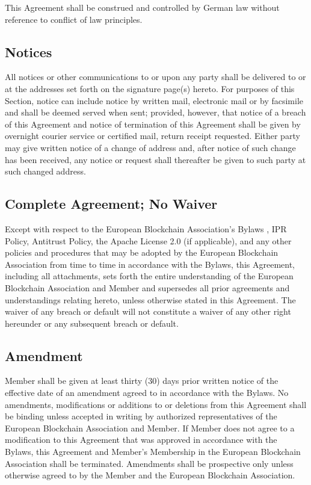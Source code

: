 \documentclass{article}
\begin{document}
This Agreement shall be construed and controlled by German law without reference to conflict of law principles.

\subsection{Notices}

All notices or other communications to or upon any party shall be delivered to or at the addresses set forth on the signature page(s) hereto. For purposes of this Section, notice can include notice by written mail, electronic mail or by facsimile and shall be deemed served when sent; provided, however, that notice of a breach of this Agreement and notice of termination of this Agreement shall be given by overnight courier service or certified mail, return receipt requested. Either party may give written notice of a change of address and, after notice of such change has been received, any notice or request shall thereafter be given to such party at such changed address.

\subsection{Complete Agreement; No Waiver}

Except with respect to the European Blockchain Association’s Bylaws , IPR Policy, Antitrust Policy, the Apache License 2.0 (if applicable), and any other policies and procedures that may be adopted by the European Blockchain Association from time to time in accordance with the Bylaws, this Agreement, including all attachments, sets forth the entire understanding of the European Blockchain Association and Member and supersedes all prior agreements and understandings relating hereto, unless otherwise stated in this Agreement. 
The waiver of any breach or default will not constitute a waiver of any other right hereunder or any subsequent breach or default.

\subsection{Amendment}

Member shall be given at least thirty (30) days prior written notice of the effective date of an amendment agreed to in accordance with the Bylaws. 
No amendments, modifications or additions to or deletions from this Agreement shall be binding unless accepted in writing by authorized representatives of the European Blockchain Association and Member. 
If Member does not agree to a modification to this Agreement that was approved in accordance with the Bylaws, this Agreement and Member’s Membership in the European Blockchain Association shall be terminated.
 Amendments shall be prospective only unless otherwise agreed to by the Member and the European Blockchain Association.
\end{document}
